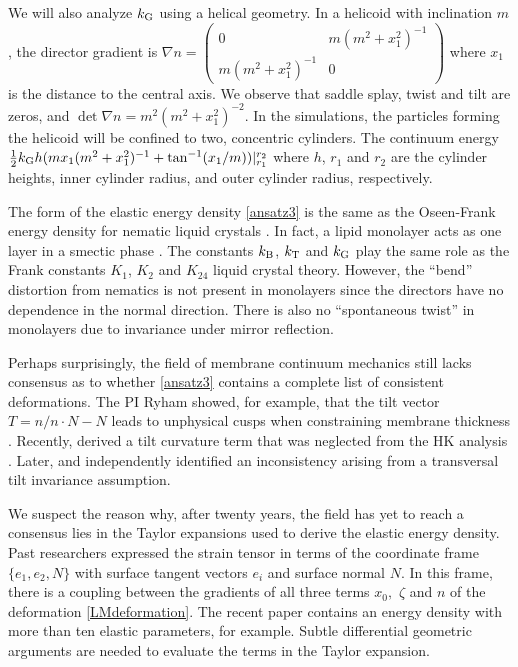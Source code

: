 We will also analyze $k_{\mathrm{G}}$ using a helical geometry. In a helicoid with inclination $m$, the director
gradient is $\nabla n = \begin{pmatrix} 0 & m(m^2+x_1^2)^{-1} \\ m(m^2+x_1^2)^{-1} & 0\end{pmatrix}$ where $x_1$ is the distance to the central
axis. We observe that saddle splay, twist and tilt are zeros, and $\det \nabla n = m^2(m^2+x_1^2)^{-2}$.
In the simulations, the particles forming the helicoid will be confined to two, concentric cylinders. The
continuum energy $\tfrac{1}{2}k_{\mathrm{G}} h(m x_1(m^2+x_1^2)^{-1} + \tan^{-1}(x_1/m)) |_{r_1}^{r_2}$ where $h$, $r_1$ and $r_2$
are the cylinder heights, inner cylinder radius, and outer cylinder radius, respectively. 

The form of the elastic energy density \eqref{ansatz3} is the same as
the Oseen-Frank energy density for nematic liquid crystals \cite{ANDRIENKO2018520,Tran7106}.  In fact,  
a lipid monolayer acts as one layer in a smectic  phase \cite{REYESMATEO1995978,Rangamani20140463,PhysRevLett.113.248102}. 
The constants $k_{\mathrm{B}}$, $k_{\mathrm{T}}$  and $k_{\mathrm{G}}$ play the same role as the Frank constants $K_1$, $K_2$ and $K_{24}$
liquid crystal theory. However, the ``bend'' distortion from nematics  
is not present in monolayers since the directors have no dependence in the normal direction.
There is also no ``spontaneous twist'' in monolayers due to invariance under mirror reflection. 

 Perhaps surprisingly, the field of membrane continuum mechanics still lacks consensus as to
  whether \eqref{ansatz3} contains a complete list of consistent deformations.
  The PI Ryham showed, for example, that the tilt vector $T = n/n\cdot N - N$ leads to unphysical cusps when constraining membrane thickness
 \cite{RyKlYaCo16}.
  Recently, \cite{10.1063/1.4990404} derived a tilt curvature term that was neglected from the HK analysis \cite{HaKo2000}.
  Later, \cite{https://doi.org/10.1039/C9SM02079A} 
  and \cite{10.1103/PhysRevE.102.042406} independently identified an inconsistency \cite{10.1063/1.4990404} arising
  from a transversal tilt invariance assumption. 

  We suspect the reason why, after twenty years, the field has yet to reach a consensus 
  lies in the Taylor expansions used to derive the elastic energy density. 
  Past researchers expressed the strain tensor in
  terms of the coordinate frame $\{e_1, e_2, N\}$ with surface tangent vectors $e_i$ and surface normal $N$.  
  In this frame, there is a coupling between the gradients of all three terms $x_0,$ $\zeta$ and $n$ of the deformation \eqref{LMdeformation}.
  The recent paper \cite{10.1103/PhysRevE.102.042406} contains an energy density with more than ten elastic parameters, for example.
  Subtle differential geometric arguments are needed to evaluate the terms in the Taylor expansion.

